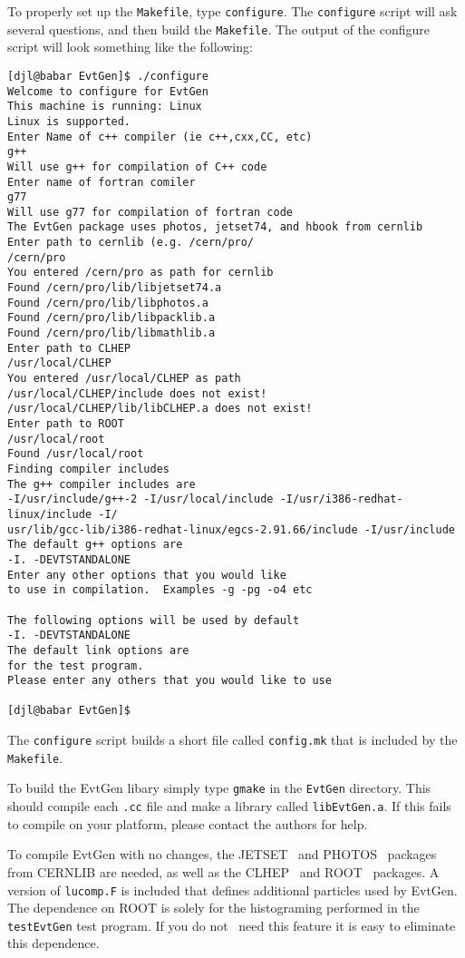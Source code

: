 To properly set up the {\tt Makefile}, type {\tt configure}.
The {\tt configure} script will ask several questions,
and then build the {\tt Makefile}.  The output of the configure
script will look something like the following:
\begin{verbatim}
[djl@babar EvtGen]$ ./configure 
Welcome to configure for EvtGen
This machine is running: Linux
Linux is supported.
Enter Name of c++ compiler (ie c++,cxx,CC, etc)
g++
Will use g++ for compilation of C++ code
Enter name of fortran comiler
g77
Will use g77 for compilation of fortran code
The EvtGen package uses photos, jetset74, and hbook from cernlib
Enter path to cernlib (e.g. /cern/pro/
/cern/pro
You entered /cern/pro as path for cernlib
Found /cern/pro/lib/libjetset74.a
Found /cern/pro/lib/libphotos.a
Found /cern/pro/lib/libpacklib.a
Found /cern/pro/lib/libmathlib.a
Enter path to CLHEP
/usr/local/CLHEP
You entered /usr/local/CLHEP as path 
/usr/local/CLHEP/include does not exist!
/usr/local/CLHEP/lib/libCLHEP.a does not exist!
Enter path to ROOT
/usr/local/root
Found /usr/local/root
Finding compiler includes
The g++ compiler includes are
-I/usr/include/g++-2 -I/usr/local/include -I/usr/i386-redhat-linux/include -I/
usr/lib/gcc-lib/i386-redhat-linux/egcs-2.91.66/include -I/usr/include
The default g++ options are 
-I. -DEVTSTANDALONE
Enter any other options that you would like
to use in compilation.  Examples -g -pg -o4 etc

The following options will be used by default
-I. -DEVTSTANDALONE
The default link options are  
for the test program.
Please enter any others that you would like to use

[djl@babar EvtGen]$ 
\end{verbatim}

The {\tt configure} script builds a short file
called {\tt config.mk} that is included by the {\tt Makefile}.

To build the EvtGen libary simply type {\tt gmake} in
the {\tt EvtGen} directory.  This should compile each
{\tt .cc} file and make a library called {\tt libEvtGen.a}.  If
this fails to compile on your platform, please contact the
authors for help.  

To compile EvtGen with no changes, the
JETSET~\cite{jetset} 
and PHOTOS~\cite{Was92} packages from CERNLIB are needed, as well
as the CLHEP~\cite{clhep} and ROOT~\cite{root} packages.  
A version of {\tt lucomp.F} is included that defines 
additional particles used by EvtGen. The
dependence on ROOT is solely for the histograming 
performed in the {\tt testEvtGen} test program.  If you do not \
need this feature it is easy to eliminate this dependence. 


